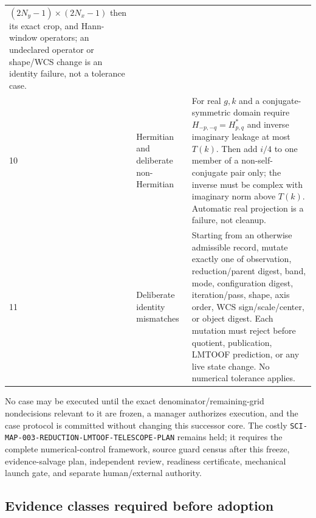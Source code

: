 \documentclass[11pt]{article}
\begin{document}
\begin{longtable}{@{}L{0.05\textwidth}L{0.24\textwidth}L{0.62\textwidth}@{}}
$(2N_y-1)\times(2N_x-1)$ then its exact crop, and Hann-window operators; an
undeclared operator or shape/WCS change is an identity failure, not a tolerance
case. \\
10 & Hermitian and deliberate non-Hermitian & For real $g,k$ and a
conjugate-symmetric domain require
$H_{-p,-q}=H_{p,q}^*$ and inverse imaginary leakage at most $T(k)$.  Then add
$i/4$ to one member of a non-self-conjugate pair only; the inverse must be
complex with imaginary norm above $T(k)$.  Automatic real projection is a
failure, not cleanup. \\
11 & Deliberate identity mismatches & Starting from an otherwise admissible
record, mutate exactly one of observation, reduction/parent digest, band,
mode, configuration digest, iteration/pass, shape, axis order, WCS
sign/scale/center, or object digest.  Each mutation must reject before quotient,
publication, LMTOOF prediction, or any live state change.  No numerical
tolerance applies. \\
\bottomrule
\end{longtable}

No case may be executed until the exact denominator/remaining-grid
nondecisions relevant to it are frozen, a manager authorizes execution, and the
case protocol is committed without changing this successor core.  The costly
\texttt{SCI-MAP-003-REDUCTION-LMTOOF-TELESCOPE-PLAN} remains held; it requires
the complete numerical-control framework, source guard census after this
freeze, evidence-salvage plan, independent review, readiness certificate,
mechanical launch gate, and separate human/external authority.

\subsection{Evidence classes required before adoption}
\end{document}
